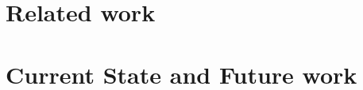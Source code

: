\documentclass{llncs}
\begin{document}
\section{Related work}
\label{secRelatedWork}



\section{Current State and Future work}
\label{secFutureWork}






\end{document}
